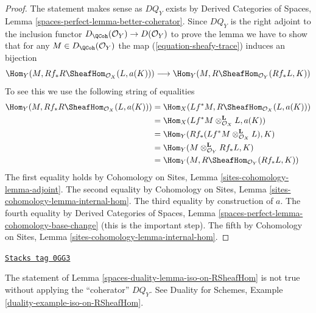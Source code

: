 \begin{proof}
The statement makes sense as $DQ_Y$ exists by
Derived Categories of Spaces, Lemma
\ref{spaces-perfect-lemma-better-coherator}.
Since $DQ_Y$ is the right adjoint to the inclusion
functor $D_\QCoh(\mathcal{O}_Y) \to D(\mathcal{O}_Y)$
to prove the lemma we have to show that for any
$M \in D_\QCoh(\mathcal{O}_Y)$
the map (\ref{equation-sheafy-trace}) induces an bijection
$$
\Hom_Y(M, Rf_*R\SheafHom_{\mathcal{O}_X}(L, a(K)))
\longrightarrow
\Hom_Y(M, R\SheafHom_{\mathcal{O}_Y}(Rf_*L, K))
$$
To see this we use the following string of equalities
\begin{align*}
\Hom_Y(M, Rf_*R\SheafHom_{\mathcal{O}_X}(L, a(K)))
& =
\Hom_X(Lf^*M, R\SheafHom_{\mathcal{O}_X}(L, a(K))) \\
& =
\Hom_X(Lf^*M \otimes_{\mathcal{O}_X}^\mathbf{L} L, a(K)) \\
& =
\Hom_Y(Rf_*(Lf^*M \otimes_{\mathcal{O}_X}^\mathbf{L} L), K) \\
& =
\Hom_Y(M \otimes_{\mathcal{O}_Y}^\mathbf{L} Rf_*L, K) \\
& =
\Hom_Y(M, R\SheafHom_{\mathcal{O}_Y}(Rf_*L, K))
\end{align*}
The first equality holds by Cohomology on Sites, Lemma
\ref{sites-cohomology-lemma-adjoint}.
The second equality by Cohomology on Sites, Lemma
\ref{sites-cohomology-lemma-internal-hom}.
The third equality by construction of $a$.
The fourth equality by Derived Categories of Spaces, Lemma
\ref{spaces-perfect-lemma-cohomology-base-change} (this is the important step).
The fifth by Cohomology on Sites, Lemma
\ref{sites-cohomology-lemma-internal-hom}.
\end{proof}

\begin{example}
\label{spaces-duality-example-iso-on-RSheafHom}
\href{https://stacks.math.columbia.edu/tag/0GG3}{\texttt{Stacks tag 0GG3}}

The statement of Lemma \ref{spaces-duality-lemma-iso-on-RSheafHom} is not true without
applying the ``coherator'' $DQ_Y$. See
Duality for Schemes, Example \ref{duality-example-iso-on-RSheafHom}.
\end{example}

